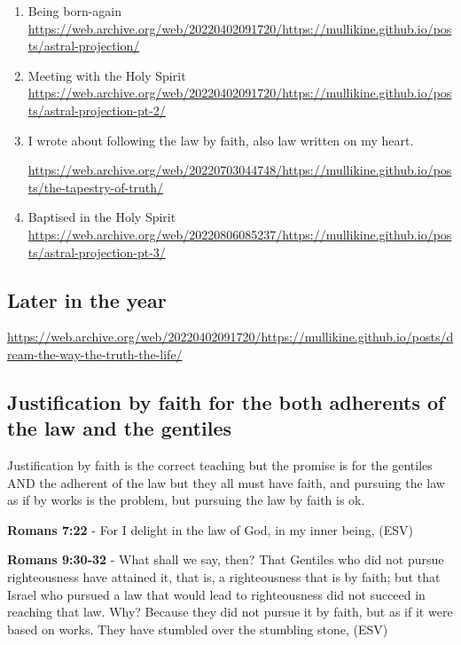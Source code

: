 \documentclass[11pt]{article}
\begin{document}
\begin{enumerate}
\item Being born-again
\label{sec:orgccd5e97}
\url{https://web.archive.org/web/20220402091720/https://mullikine.github.io/posts/astral-projection/}

\item Meeting with the Holy Spirit
\label{sec:orgf7d1257}
\url{https://web.archive.org/web/20220402091720/https://mullikine.github.io/posts/astral-projection-pt-2/}

\item I wrote about following the law by faith, also law written on my heart.
\label{sec:orged27e48}

\url{https://web.archive.org/web/20220703044748/https://mullikine.github.io/posts/the-tapestry-of-truth/}

\item Baptised in the Holy Spirit
\label{sec:org598f065}
\url{https://web.archive.org/web/20220806085237/https://mullikine.github.io/posts/astral-projection-pt-3/}
\end{enumerate}

\subsection{Later in the year}
\label{sec:orgfd377a5}
\url{https://web.archive.org/web/20220402091720/https://mullikine.github.io/posts/dream-the-way-the-truth-the-life/}

\subsection{Justification by faith for the both adherents of the law and the gentiles}
\label{sec:org909e4a3}
Justification by faith is the correct teaching but the promise is for the gentiles AND the adherent of the law but they all must have faith, and pursuing the law as if by works is the problem, but pursuing the law by faith is ok.

\textbf{Romans 7:22} - For I delight in the law of God, in my inner being, (ESV)

\textbf{Romans 9:30-32} - What shall we say, then? That Gentiles who did not pursue righteousness have attained it, that is, a righteousness that is by faith; but that Israel who pursued a law that would lead to righteousness did not succeed in reaching that law. Why? Because they did not pursue it by faith, but as if it were based on works. They have stumbled over the stumbling stone, (ESV)
\end{document}
